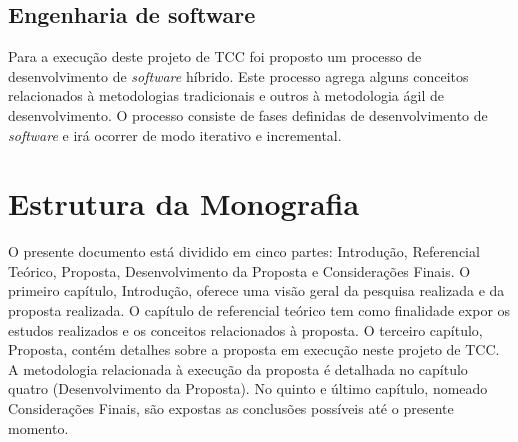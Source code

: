 \subsection{Engenharia de software}

Para a execução deste projeto de TCC foi proposto um processo de desenvolvimento de \textit{software} híbrido. Este processo agrega alguns conceitos relacionados à metodologias tradicionais e outros à metodologia ágil de desenvolvimento. O processo consiste de fases definidas de desenvolvimento de \textit{software} e irá ocorrer de modo iterativo e incremental.

\section{Estrutura da Monografia}
O presente documento está dividido em cinco partes: Introdução, Referencial Teórico, Proposta, Desenvolvimento da Proposta e Considerações Finais. O primeiro capítulo, Introdução, oferece uma visão geral da pesquisa realizada e da proposta realizada. O capítulo de referencial teórico tem como finalidade expor os estudos realizados e os conceitos relacionados à proposta. O terceiro capítulo, Proposta, contém detalhes sobre a proposta em execução neste projeto de TCC. A metodologia relacionada à execução da proposta é detalhada no capítulo quatro (Desenvolvimento da Proposta). No quinto e último capítulo, nomeado Considerações Finais, são expostas as conclusões possíveis até o presente momento.